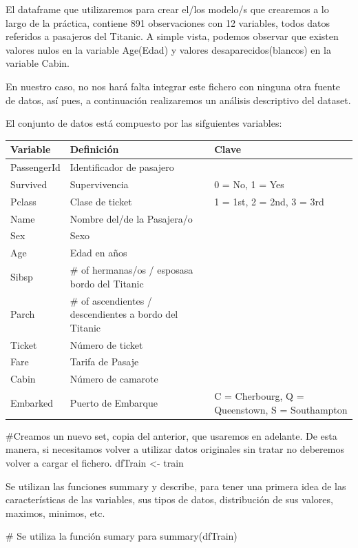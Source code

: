\documentclass[
]{article}
\newenvironment{Shaded}{\begin{snugshade}}{\end{snugshade}}
\newcommand{\CommentTok}[1]{\textcolor[rgb]{0.50,0.62,0.50}{#1}}
\newcommand{\KeywordTok}[1]{\textcolor[rgb]{0.94,0.87,0.69}{#1}}
\newcommand{\NormalTok}[1]{\textcolor[rgb]{0.80,0.80,0.80}{#1}}
\newcommand{\StringTok}[1]{\textcolor[rgb]{0.80,0.58,0.58}{#1}}
\begin{document}
El dataframe que utilizaremos para crear el/los modelo/s que crearemos a
lo largo de la práctica, contiene 891 observaciones con 12 variables,
todos datos referidos a pasajeros del Titanic. A simple vista, podemos
observar que existen valores nulos en la variable Age(Edad) y valores
desaparecidos(blancos) en la variable Cabin.

En nuestro caso, no nos hará falta integrar este fichero con ninguna
otra fuente de datos, así pues, a continuación realizaremos un análisis
descriptivo del dataset.

El conjunto de datos está compuesto por las sifguientes variables:

\begin{longtable}[]{@{}lll@{}}
\toprule
\textbf{Variable} & \textbf{Definición} & \textbf{Clave}\tabularnewline
\midrule
\endhead
PassengerId & Identificador de pasajero &\tabularnewline
Survived & Supervivencia & 0 = No, 1 = Yes\tabularnewline
Pclass & Clase de ticket & 1 = 1st, 2 = 2nd, 3 = 3rd\tabularnewline
Name & Nombre del/de la Pasajera/o &\tabularnewline
Sex & Sexo &\tabularnewline
Age & Edad en años &\tabularnewline
Sibsp & \# of hermanas/os / esposasa bordo del Titanic &\tabularnewline
Parch & \# of ascendientes / descendientes a bordo del Titanic
&\tabularnewline
Ticket & Número de ticket &\tabularnewline
Fare & Tarifa de Pasaje &\tabularnewline
Cabin & Número de camarote &\tabularnewline
Embarked & Puerto de Embarque & C = Cherbourg, Q = Queenstown, S =
Southampton\tabularnewline
\bottomrule
\end{longtable}

\begin{Shaded}
\begin{Highlighting}[]
\CommentTok{#Creamos un nuevo set, copia del anterior, que usaremos en adelante. De esta manera, si necesitamos volver a utilizar datos originales sin tratar no deberemos volver a cargar el fichero.}
\NormalTok{dfTrain <-}\StringTok{ }\NormalTok{train}
\end{Highlighting}
\end{Shaded}

Se utilizan las funciones summary y describe, para tener una primera
idea de las características de las variables, sus tipos de datos,
distribución de sus valores, maximos, minimos, etc.

\begin{Shaded}
\begin{Highlighting}[]
\CommentTok{# Se utiliza la función sumary para }
\KeywordTok{summary}\NormalTok{(dfTrain)}
\end{Highlighting}
\end{Shaded}
\end{document}

